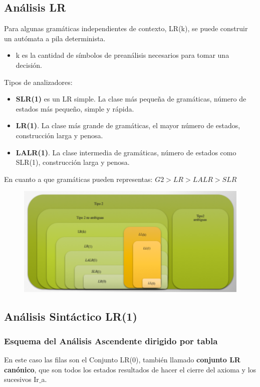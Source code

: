 \documentclass[12pt, twoside, openright]{report} %
\begin{document}
\subsection{Análisis LR}
Para algunas gramáticas independientes de contexto, LR(k), se puede construir un autómata a pila determinista.

\begin{itemize}
  \item k es la cantidad de símbolos de preanálisis necesarios para tomar una decisión.
\end{itemize}

Tipos de analizadores:
\begin{itemize}
  \item \textbf{SLR(1)} es un LR simple. La clase más pequeña de gramáticas, número de estados más pequeño, simple y rápida.
  \item \textbf{LR(1)}. La clase más grande de gramáticas, el mayor número de estados, construcción larga y penosa.
  \item \textbf{LALR(1)}. La clase intermedia de gramáticas, número de estados como SLR(1), construcción larga y penosa.
\end{itemize}
En cuanto a que gramáticas pueden representas: $G2>LR>LALR>SLR$

\begin{figure}[H]
	{\includegraphics[scale=.57]{2021-04-13 15_35_24-ASintactico.pdf - Foxit Reader.png}}
\end{figure}

\subsection{Análisis Sintáctico LR(1)}

\subsubsection{Esquema del Análisis Ascendente dirigido por tabla}
En este caso las filas son el Conjunto LR(0), también llamado \textbf{conjunto LR canónico}, que son todos los estados resultados de hacer el cierre del axioma y los sucesivos Ir$\_$a.
\end{document}
